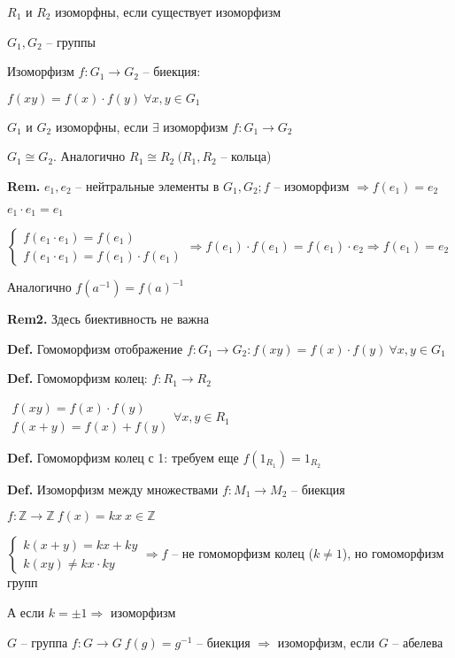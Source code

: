 \documentclass[14pt, letter paper]{article}
\begin{document}
$R_1$ и $R_2$ изоморфны, если существует изоморфизм

$G_1, G_2$ -- группы

Изоморфизм $f: G_1 \rightarrow G_2$ -- биекция:

$f(xy) = f(x) \cdot f(y)\ \forall x, y \in G_1$

$G_1$ и $G_2$ изоморфны, если $\exists$ изоморфизм $f : G_1 \rightarrow G_2$

$G_1 \cong G_2$. Аналогично $R_1 \cong R_2\ (R_1, R_2$ -- кольца)

\textbf{Rem.} $e_1, e_2$ -- нейтральные элементы в $G_1, G_2; f$ -- изоморфизм $\Rightarrow f(e_1) = e_2$

$e_1 \cdot e_1 = e_1$

$\begin{cases}
    f(e_1 \cdot e_1) = f(e_1) \\
    f(e_1 \cdot e_1) = f(e_1) \cdot f(e_1)
\end{cases} \Rightarrow f(e_1) \cdot f(e_1) = f(e_1) \cdot e_2 \Rightarrow f(e_1) = e_2$

Аналогично $f(a^{-1}) = f(a)^{-1}$

\textbf{Rem2.} Здесь биективность не важна

\textbf{Def.} Гомоморфизм отображение $f : G_1 \rightarrow G_2 : f(xy) = f(x) \cdot f(y)\ \forall x, y \in G_1$

\textbf{Def.} Гомоморфизм колец: $f: R_1 \rightarrow R_2$

$\begin{gathered}
    f(xy) = f(x) \cdot f(y) \\
    f(x + y) = f(x) + f(y)
\end{gathered} \forall x, y \in R_1$

\textbf{Def.} Гомоморфизм колец с 1: требуем еще $f(1_{R_1}) = 1_{R_2}$

\textbf{Def.} Изоморфизм между множествами $f: M_1 \rightarrow M_2$ -- биекция

$f : \mathds{Z} \rightarrow \mathds{Z}\ f(x) = kx\ x \in \mathds{Z}$

$\begin{cases}
    k(x+y) = kx + ky \\
    k(xy) \neq kx \cdot ky
\end{cases} \Rightarrow f$ -- не гомоморфизм колец ($k \neq 1$), но гомоморфизм групп

А если $k = \pm 1 \Rightarrow$ изоморфизм

$G$ -- группа $f: G \rightarrow G\ f(g) = g^{-1}$ -- биекция $\Rightarrow$ изоморфизм, если $G$ -- абелева
\end{document}
